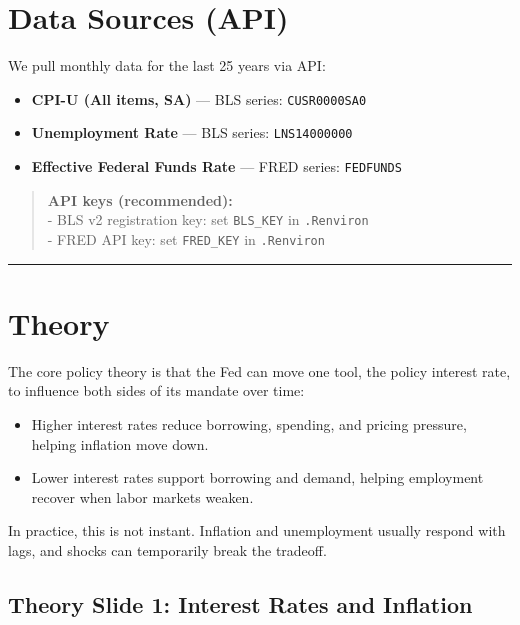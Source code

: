\documentclass[
  11pt,
]{article}
\providecommand{\tightlist}{%
  \setlength{\itemsep}{0pt}\setlength{\parskip}{0pt}}
\begin{document}
\section{Data Sources (API)}\label{data-sources-api}

We pull monthly data for the last 25 years via API:

\begin{itemize}
\tightlist
\item
  \textbf{CPI-U (All items, SA)} --- BLS series: \texttt{CUSR0000SA0}\\
\item
  \textbf{Unemployment Rate} --- BLS series: \texttt{LNS14000000}\\
\item
  \textbf{Effective Federal Funds Rate} --- FRED series:
  \texttt{FEDFUNDS}
\end{itemize}

\begin{quote}
\textbf{API keys (recommended):}\\
- BLS v2 registration key: set \texttt{BLS\_KEY} in \texttt{.Renviron}\\
- FRED API key: set \texttt{FRED\_KEY} in \texttt{.Renviron}
\end{quote}

\begin{center}\rule{0.5\linewidth}{0.5pt}\end{center}

\section{Theory}\label{theory}

The core policy theory is that the Fed can move one tool, the policy
interest rate, to influence both sides of its mandate over time:

\begin{itemize}
\tightlist
\item
  Higher interest rates reduce borrowing, spending, and pricing
  pressure, helping inflation move down.
\item
  Lower interest rates support borrowing and demand, helping employment
  recover when labor markets weaken.
\end{itemize}

In practice, this is not instant. Inflation and unemployment usually
respond with lags, and shocks can temporarily break the tradeoff.

\subsection{Theory Slide 1: Interest Rates and
Inflation}\label{theory-slide-1-interest-rates-and-inflation}
\end{document}
